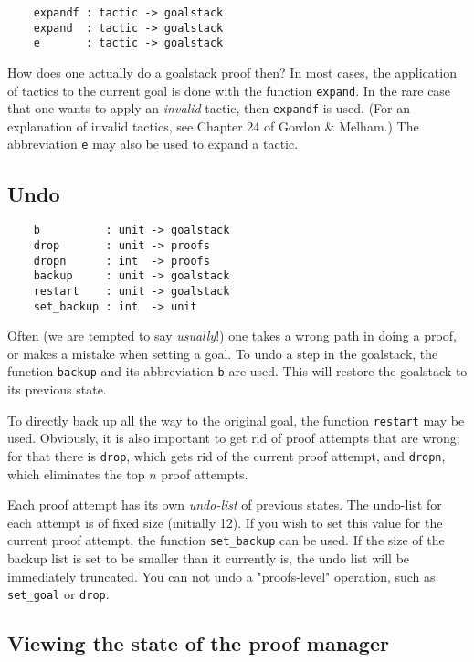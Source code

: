 \begin{verbatim}
    expandf : tactic -> goalstack
    expand  : tactic -> goalstack
    e       : tactic -> goalstack
\end{verbatim}

How does one actually do a goalstack proof then? In most cases, the
application of tactics to the current goal is done with the function
\verb+expand+. In the rare case that one wants to apply an
{\it invalid\/} tactic, then \verb+expandf+ is used. (For an
explanation of invalid tactics, see Chapter 24 of Gordon \& Melham.) The
abbreviation \verb+e+ may also be used to expand a tactic. 


\subsection{Undo}

\begin{verbatim}
    b          : unit -> goalstack
    drop       : unit -> proofs
    dropn      : int  -> proofs
    backup     : unit -> goalstack
    restart    : unit -> goalstack
    set_backup : int  -> unit
\end{verbatim}

Often (we are tempted to say {\it usually}!) one takes a wrong path
in doing a proof, or makes a mistake when setting a goal. To undo a step
in the goalstack, the function \verb+backup+ and its abbreviation
\verb+b+ are used. This will restore the goalstack to its previous
state.


To directly back up all the way to the original goal, the function
\verb+restart+ may be used. Obviously, it is also important to get
rid of proof attempts that are wrong; for that there is \verb+drop+,
which gets rid of the current proof attempt, and \verb+dropn+, which
eliminates the top $n$ proof attempts.


Each proof attempt has its own {\it undo-list\/} of previous
states. The undo-list for each attempt is of fixed size (initially
12). If you wish to set this value for the current proof attempt, the
function \verb+set_backup+ can be used. If the size of the backup
list is set to be smaller than it currently is, the undo list will be
immediately truncated. You can not undo a "proofs-level" operation, such
as \verb+set_goal+ or \verb+drop+.

\subsection{Viewing the state of the proof manager}

